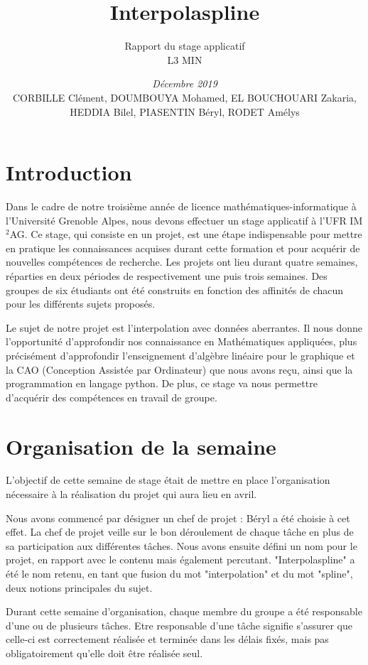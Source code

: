 \documentclass[a4paper,10pt]{article} %
\title{\textbf{Interpolaspline}}
\author{Rapport du stage applicatif\\ L3 MIN}
\date{\emph{Décembre 2019}\\CORBILLE Clément, DOUMBOUYA Mohamed, EL BOUCHOUARI Zakaria, HEDDIA Bilel, PIASENTIN Béryl, RODET Amélys}
\begin{document}

\maketitle %
\tableofcontents %

\newpage

\section*{Introduction}
Dans le cadre de notre troisième année de licence mathématiques-informatique à l’Université Grenoble Alpes, nous devons effectuer un stage applicatif à l’UFR IM$^2$AG. Ce stage, qui consiste en un projet, est une étape indispensable pour mettre en pratique les connaissances acquises durant cette formation et pour acquérir de nouvelles compétences de recherche. Les projets ont lieu durant quatre semaines, réparties en deux périodes de respectivement une puis trois semaines. Des groupes de six étudiants ont été construits en fonction des affinités de chacun pour les différents sujets proposés.

Le sujet de notre projet est l'interpolation avec données aberrantes. Il nous donne l’opportunité d’approfondir nos connaissance en Mathématiques appliquées, plus précisément d'approfondir l'enseignement d'algèbre linéaire pour le graphique et la CAO (Conception Assistée par Ordinateur) que nous avons reçu, ainsi que la programmation en langage  python. De plus, ce stage va nous permettre d'acquérir des compétences en travail de groupe.

\section{Organisation de la semaine}

L'objectif de cette semaine de stage était de mettre en place l'organisation nécessaire à la réalisation du projet qui aura lieu en avril.

Nous avons commencé par désigner un chef de projet : Béryl a été choisie à cet effet. La chef de projet veille sur le bon déroulement de chaque tâche en plus de sa participation aux différentes tâches. Nous avons ensuite défini un nom pour le projet, en rapport avec le contenu mais également percutant. "Interpolaspline" a été le nom retenu, en tant que fusion du mot "interpolation" et du mot "spline", deux notions principales du sujet.

Durant cette semaine d'organisation, chaque membre du groupe a été responsable d’une ou de plusieurs tâches. Etre responsable d'une tâche signifie s'assurer que celle-ci est correctement réalisée et terminée dans les délais fixés, mais pas obligatoirement qu'elle doit être réalisée seul.
\end{document}
